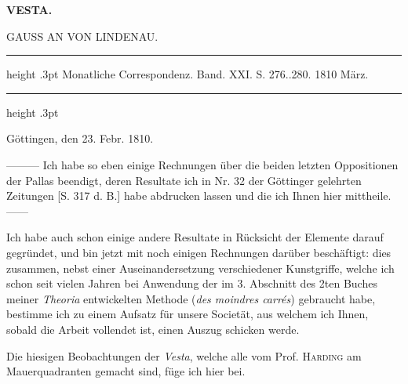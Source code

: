 \clearpage
\thispagestyle{empty}
\noindent{}%
%
\parbox[t]{\dimexpr\linewidth-24mm\relax}{\centering\footnotesize\bfseries VESTA.\par}%
\makebox[12mm][r]{}\par\nobreak\medskip

\begin{center}\large GAUSS AN VON LINDENAU.\end{center}
\begin{center}\parbox{.85\linewidth}{\centering\footnotesize\frenchspacing
\hrule height .3pt\relax\vspace{2.5pt}
Monatliche Correspondenz. Band. XXI. S. 276..280. 1810 März.\par
\vspace{2.5pt}\hrule height .3pt\relax
}\end{center}
\begin{flushright}Göttingen, den 23. Febr. 1810.\end{flushright}

\par\indent ---\enspace---\enspace--- Ich habe so eben einige Rechnungen über die beiden letzten Oppositionen der Pallas beendigt, deren Resultate ich in Nr. 32 der Göttinger gelehrten Zeitungen [S. 317 d. B.] habe abdrucken lassen und die ich Ihnen hier mittheile. ---\enspace---

Ich habe auch schon einige andere Resultate in Rücksicht der Elemente darauf gegründet, und bin jetzt mit noch einigen Rechnungen darüber beschäftigt: dies zusammen, nebst einer Auseinandersetzung verschiedener Kunstgriffe, welche ich schon seit vielen Jahren bei Anwendung der im 3. Abschnitt des 2ten Buches meiner \emph{Theoria} entwickelten Methode (\emph{des moindres carrés}) gebraucht habe, bestimme ich zu einem Aufsatz für unsere Societät, aus welchem ich Ihnen, sobald die Arbeit vollendet ist, einen Auszug schicken werde.

Die hiesigen Beobachtungen der \emph{Vesta}, welche alle vom Prof. \textsc{Harding} am Mauerquadranten gemacht sind, füge ich hier bei.

